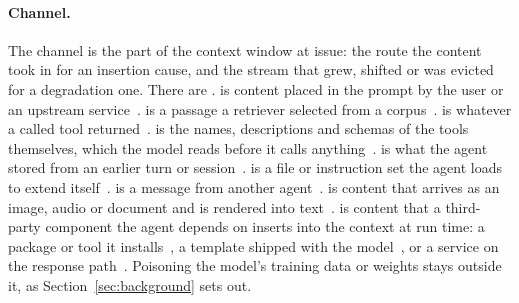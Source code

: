 \paragraph{Channel.} The channel is the part of the context window at issue:
the route the content took in for an insertion cause, and the stream that
grew, shifted or was evicted for a degradation one. There are
\NChannelCats{}.  is content placed in the prompt by the user
or an upstream service~\cite{liu-2023-promptb}.  is a passage a retriever selected from a
corpus~\cite{zhong-2023-poisoning,zou-2024-poisonedrag}.  is whatever a called tool returned~\cite{greshake-2023-not}.
 is the names, descriptions and schemas of the tools
themselves, which the model reads before it calls anything~\cite{shi-2025-prompt}.  is
what the agent stored from an earlier turn or session~\cite{chen-2024-agentpoison}.  is a file or
instruction set the agent loads to extend itself~\cite{schmotz-2025-agent}.  is a
message from another agent~\cite{chen-2023-scalable}.  is content that arrives as an
image, audio or document and is rendered into text~\cite{zhu-2024-unraveling}.  is
content that a third-party component the agent depends on inserts into the
context at run time: a package or tool it installs~\cite{spira-2026-beware},
a template shipped with the model~\cite{fogel-2026-inferencetime}, or a
service on the response path~\cite{luo-2026-rewriting}. Poisoning the model's
training data or weights stays outside it, as Section~\ref{sec:background}
sets out.


